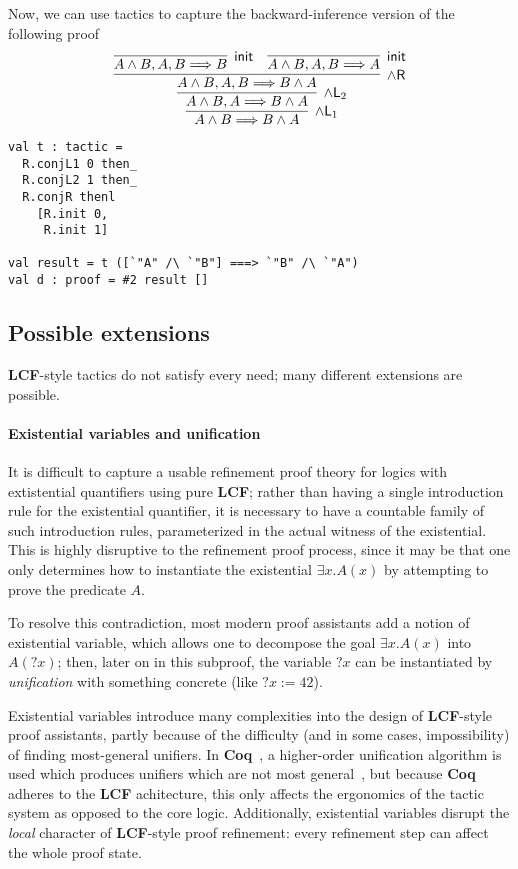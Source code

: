 \documentclass{article}
\newcommand\FormatLang[1]{{\bfseries\sffamily #1}}
\newcommand\LCF{\FormatLang{LCF}}
\newcommand\Coq{\FormatLang{Coq}}
\newcommand\Seq[2]{{#1}\Longrightarrow{#2}}
\newcommand\Right[1]{{#1}\mathsf{R}}
\newcommand\Left[1]{{#1}\mathsf{L}}
\newcommand\RuleInit{\mathsf{init}}
\theoremstyle{definition}
\theoremstyle{remark}
\begin{document}
Now, we can use tactics to capture the backward-inference version of
the following proof
\[
  \infer[\Left{\land}_1]{
    \Seq{A\land B}{B\land A}
  }{
    \infer[\Left{\land}_2]{
      \Seq{A\land B,A}{B\land A}
    }{
      \infer[\Right{\land}]{
        \Seq{A\land B,A,B}{B\land A}
      }{
        \infer[\RuleInit]{
          \Seq{A\land B,A,B}{B}
        }{
        }
        &
        \infer[\RuleInit]{
          \Seq{A\land B,A,B}{A}
        }{
        }
      }
    }
  }
\]

\begin{verbatim}
val t : tactic =
  R.conjL1 0 then_
  R.conjL2 1 then_
  R.conjR thenl
    [R.init 0,
     R.init 1]

val result = t ([`"A" /\ `"B"] ===> `"B" /\ `"A")
val d : proof = #2 result []
\end{verbatim}


\subsection{Possible extensions}

\LCF{}-style tactics do not satisfy every need; many different
extensions are possible.

\paragraph{Existential variables and unification}

It is difficult to capture a usable refinement proof theory for logics
with extistential quantifiers using pure \LCF{}; rather than having a
single introduction rule for the existential quantifier, it is
necessary to have a countable family of such introduction rules,
parameterized in the actual witness of the existential. This is highly
disruptive to the refinement proof process, since it may be that one
only determines how to instantiate the existential $\exists x.A(x)$ by
attempting to prove the predicate $A$.

To resolve this contradiction, most modern proof assistants add a
notion of existential variable, which allows one to decompose the goal
$\exists x.A(x)$ into $A(?x)$; then, later on in this subproof, the
variable $?x$ can be instantiated by \emph{unification} with something
concrete (like $?x:= 42$).

Existential variables introduce many complexities into the design of
\LCF{}-style proof assistants, partly because of the difficulty (and
in some cases, impossibility) of finding most-general unifiers. In
\Coq{}~\cite{coq:reference-manual}, a higher-order unification
algorithm is used which produces unifiers which are not most
general~\cite{ziliani:2015}, but because \Coq{} adheres to the \LCF{}
achitecture, this only affects the ergonomics of the tactic system as
opposed to the core logic. Additionally, existential variables disrupt
the \emph{local} character of \LCF{}-style proof refinement: every
refinement step can affect the whole proof state.
\end{document}
